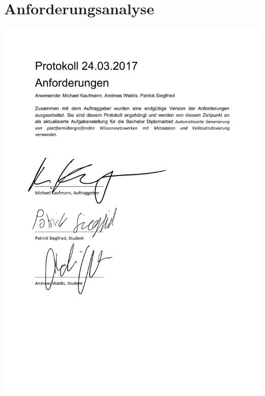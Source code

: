 \section{Anforderungsanalyse}\label{anforderungsanalyse-mk}
\includegraphics[page=1,scale=0.8]{kapitel/anforderungen.pdf}
